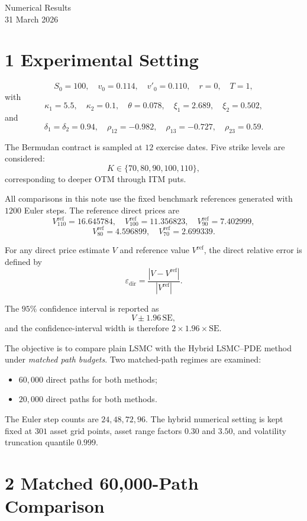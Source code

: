 \documentclass[11pt,a4paper]{article}
\begin{document}
\begin{center}
{\Large Numerical Results}\\[0.5em]
{\normalsize 31 March 2026}
\end{center}

\section*{1 \quad Experimental Setting}

\[
S_0 = 100,\quad v_0 = 0.114,\quad v'_0 = 0.110,\quad r = 0,\quad T = 1,
\]
with
\[
\kappa_1 = 5.5,\quad \kappa_2 = 0.1,\quad \theta = 0.078,\quad \xi_1 = 2.689,\quad \xi_2 = 0.502,
\]
and
\[
\delta_1 = \delta_2 = 0.94,\quad \rho_{12} = -0.982,\quad \rho_{13} = -0.727,\quad \rho_{23} = 0.59.
\]

The Bermudan contract is sampled at \(12\) exercise dates. Five strike levels are considered:
\[
K \in \{70,80,90,100,110\},
\]
corresponding to deeper OTM through ITM puts.

All comparisons in this note use the fixed benchmark references generated with \(1200\) Euler steps. The reference direct prices are
\[
V^{\mathrm{ref}}_{110} = 16.645784,\quad V^{\mathrm{ref}}_{100} = 11.356823,\quad V^{\mathrm{ref}}_{90} = 7.402999,
\]
\[
V^{\mathrm{ref}}_{80} = 4.596899,\quad V^{\mathrm{ref}}_{70} = 2.699339.
\]

For any direct price estimate \(V\) and reference value \(V^{\mathrm{ref}}\), the direct relative error is defined by
\[
\varepsilon_{\mathrm{dir}} = \frac{|V - V^{\mathrm{ref}}|}{|V^{\mathrm{ref}}|}.
\]

The \(95\%\) confidence interval is reported as
\[
V \pm 1.96\,\mathrm{SE},
\]
and the confidence-interval width is therefore \(2 \times 1.96 \times \mathrm{SE}\).

The objective is to compare plain LSMC with the Hybrid LSMC--PDE method under \emph{matched path budgets}. Two matched-path regimes are examined:
\begin{itemize}
\item \(60{,}000\) direct paths for both methods;
\item \(20{,}000\) direct paths for both methods.
\end{itemize}

The Euler step counts are \(24,48,72,96\). The hybrid numerical setting is kept fixed at \(301\) asset grid points, asset range factors \(0.30\) and \(3.50\), and volatility truncation quantile \(0.999\).

\section*{2 \quad Matched 60,000-Path Comparison}
\end{document}
